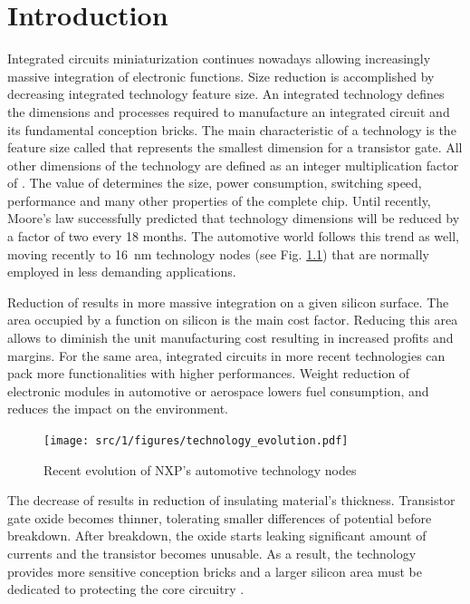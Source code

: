 \chapter{Introduction}
\label{sec:global-intro}
Integrated circuits miniaturization continues nowadays allowing increasingly massive integration of electronic functions.
Size reduction is accomplished by decreasing integrated technology feature size.
An integrated technology defines the dimensions and processes required to manufacture an integrated circuit and its fundamental conception bricks.
The main characteristic of a technology is the feature size called \textlambda{} that represents the smallest dimension for a transistor gate.
All other dimensions of the technology are defined as an integer multiplication factor of \textlambda{}.
The value of \textlambda{} determines the size, power consumption, switching speed, performance and many other properties of the complete chip.
Until recently, Moore's law successfully predicted that technology dimensions will be reduced by a factor of two every 18 months.
The automotive world follows this trend as well, moving recently to \SI{16}{\nano\metre} technology nodes (see Fig. \ref{fig:nxp-techno-increase}) \cite{evolution_technologies} that are normally employed in less demanding applications.

Reduction of \textlambda{} results in more massive integration on a given silicon surface.
The area occupied by a function on silicon is the main cost factor.
Reducing this area allows to diminish the unit manufacturing cost resulting in increased profits and margins.
For the same area, integrated circuits in more recent technologies can pack more functionalities with higher performances.
Weight reduction of electronic modules in automotive or aerospace lowers fuel consumption, and reduces the impact on the environment.

\begin{figure}[!h]
  \centering
  \texttt{[image: src/1/figures/technology\_evolution.pdf]}
  \caption{Recent evolution of NXP's automotive technology nodes \cite{evolution_technologies}}
  \label{fig:nxp-techno-increase}
\end{figure}

The decrease of \textlambda{} results in reduction of insulating material's thickness.
Transistor gate oxide becomes thinner, tolerating smaller differences of potential before breakdown.
After breakdown, the oxide starts leaking significant amount of currents and the transistor becomes unusable.
As a result, the technology provides more sensitive conception bricks and a larger silicon area must be dedicated to protecting the core circuitry \cite{evolution_technologies}.

